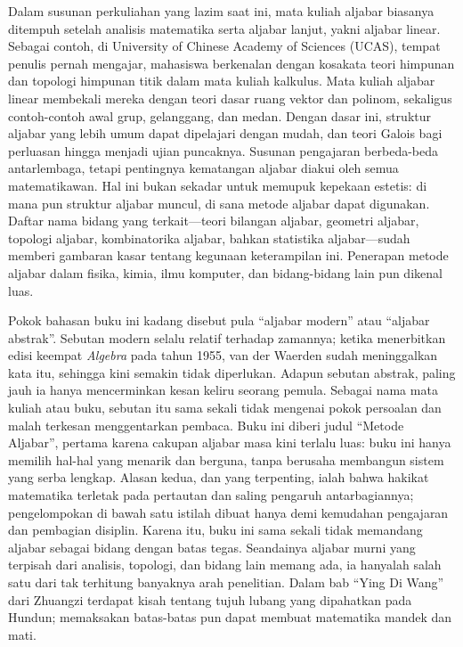 Dalam susunan perkuliahan yang lazim saat ini, mata kuliah aljabar biasanya ditempuh setelah analisis matematika serta aljabar lanjut, yakni aljabar linear. Sebagai contoh, di University of Chinese Academy of Sciences (UCAS), tempat penulis pernah mengajar, mahasiswa berkenalan dengan kosakata teori himpunan dan topologi himpunan titik dalam mata kuliah kalkulus. Mata kuliah aljabar linear membekali mereka dengan teori dasar ruang vektor dan polinom, sekaligus contoh-contoh awal grup, gelanggang, dan medan. Dengan dasar ini, struktur aljabar yang lebih umum dapat dipelajari dengan mudah, dan teori Galois bagi perluasan hingga menjadi ujian puncaknya. Susunan pengajaran berbeda-beda antarlembaga, tetapi pentingnya kematangan aljabar diakui oleh semua matematikawan. Hal ini bukan sekadar untuk memupuk kepekaan estetis: di mana pun struktur aljabar muncul, di sana metode aljabar dapat digunakan. Daftar nama bidang yang terkait—teori bilangan aljabar, geometri aljabar, topologi aljabar, kombinatorika aljabar, bahkan statistika aljabar—sudah memberi gambaran kasar tentang kegunaan keterampilan ini. Penerapan metode aljabar dalam fisika, kimia, ilmu komputer, dan bidang-bidang lain pun dikenal luas.

Pokok bahasan buku ini kadang disebut pula ``aljabar modern'' atau ``aljabar abstrak''. Sebutan modern selalu relatif terhadap zamannya; ketika menerbitkan edisi keempat \textit{Algebra} pada tahun 1955, van der Waerden sudah meninggalkan kata itu, sehingga kini semakin tidak diperlukan. Adapun sebutan abstrak, paling jauh ia hanya mencerminkan kesan keliru seorang pemula. Sebagai nama mata kuliah atau buku, sebutan itu sama sekali tidak mengenai pokok persoalan dan malah terkesan menggentarkan pembaca. Buku ini diberi judul ``Metode Aljabar'', pertama karena cakupan aljabar masa kini terlalu luas: buku ini hanya memilih hal-hal yang menarik dan berguna, tanpa berusaha membangun sistem yang serba lengkap. Alasan kedua, dan yang terpenting, ialah bahwa hakikat matematika terletak pada pertautan dan saling pengaruh antarbagiannya; pengelompokan di bawah satu istilah dibuat hanya demi kemudahan pengajaran dan pembagian disiplin. Karena itu, buku ini sama sekali tidak memandang aljabar sebagai bidang dengan batas tegas. Seandainya aljabar murni yang terpisah dari analisis, topologi, dan bidang lain memang ada, ia hanyalah salah satu dari tak terhitung banyaknya arah penelitian. Dalam bab ``Ying Di Wang'' dari Zhuangzi terdapat kisah tentang tujuh lubang yang dipahatkan pada Hundun; memaksakan batas-batas pun dapat membuat matematika mandek dan mati.

